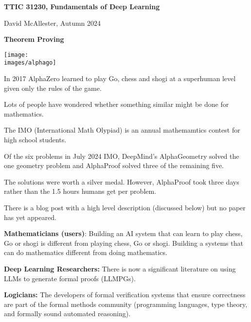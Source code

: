 




{\Huge

  \centerline{\bf TTIC 31230, Fundamentals of Deep Learning}

  
\bigskip

\centerline{David McAllester, Autumn  2024}


\vfill

\centerline{\bf Theorem Proving}

\vfill
\vfill



\centerline{\texttt{[image: \\images/alphago]}}

\vfill

In 2017 AlphaZero learned to play Go, chess and shogi at a superhuman level given only the rules of the game.

\vfill
Lots of people have wondered whether something similar might be done for mathematics.



The IMO (International Math Olypiad) is an annual mathemamtics contest for high school students.

\vfill
Of the six problems in July 2024 IMO, DeepMind's AlphaGeometry solved the one geometry problem and AlphaProof solved three of the remaining five.

\vfill
The solutions were worth a silver medal.  However, AlphaProof took three days rather than the 1.5 hours humans get per problem.

\vfill
There is a blog post with a high level description (discussed below) but no paper has yet appeared.


{\bf Mathematicians (users)}: Building an AI system that can learn to play chess, Go or shogi is different from playing
chess, Go or shogi. Building a systems that can do mathematics different from doing mathematics.


\vfill
{\bf Deep Learning Researchers:} There is now a significant literature on using LLMs to generate formal proofs (LLMPGs).

\vfill
{\bf Logicians:} The developers of formal verification systems that ensure correctness 
are part of the formal methods community (programming languages, type theory, and formally sound automated reasoning).

}
